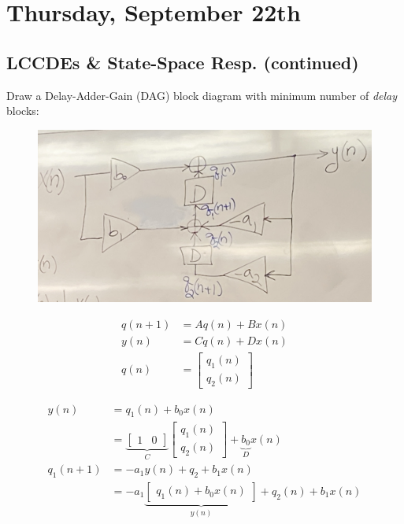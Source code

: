 \section{Thursday, September 22th}
\subsection{LCCDEs \& State-Space Resp. (continued)}
Draw a Delay-Adder-Gain (DAG) block diagram with minimum number of \textit{delay} blocks:
\begin{figure}[h]
    \centering
    \includegraphics[scale=0.1]{lectures/img/Lec8_DAG.jpg}
    \label{fig:lec8_dag}
\end{figure}

\begin{align*}
    q(n+1) &= A q(n) + B x(n)
    \\
    y(n) &= C q(n) + D x(n)
    \\
    q(n) &= \begin{bmatrix}
        q_1(n) \\ q_2(n)
    \end{bmatrix}
\end{align*}

\begin{align*}
    y(n)
    &= q_1(n) + b_0 x(n)
    \\
    &= \underbrace{\begin{bmatrix}
        1 & 0
    \end{bmatrix}}_C \begin{bmatrix}
        q_1(n)\\
        q_2(n)
    \end{bmatrix}
    + \underbrace{b_0}_D x(n)
    \\
    q_1(n+1)
    &= -a_1 y(n) + q_2 + b_1 x(n)
    \\
    &= -a_1 \underbrace{\begin{bmatrix}
        q_1(n) + b_0 x(n)
    \end{bmatrix}}_{y(n)} + q_2(n) + b_1 x(n)
\end{align*}

